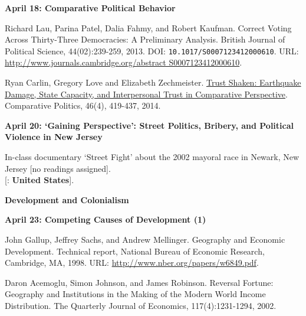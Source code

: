 \documentclass[letterpaper]{article}
\renewenvironment{itemize}{
  \begin{list}{}{
    \setlength{\leftmargin}{1.5em}
  }
}{
  \end{list}
}
\begin{document}
\begin{enumerate}
\begin{itemize}
\begin{itemize}
		\end{itemize}
	\end{itemize}


	\begin{itemize} 
		\item {\bf April 18: Comparative Political Behavior}
		\begin{itemize}
			\item[$\bullet$] Richard Lau, Parina Patel, Dalia Fahmy, and Robert Kaufman. Correct Voting Across Thirty-Three Democracies: A Preliminary Analysis. British Journal of Political Science, 44(02):239-259, 2013. DOI: \texttt{10.1017/S0007123412000610}. URL: \url{http://www.journals.cambridge.org/abstract S0007123412000610}.
			\item[$\bullet$] Ryan Carlin, Gregory Love and Elizabeth Zechmeister. \href{ http://www.jstor.org/stable/43664117}{Trust Shaken: Earthquake Damage, State Capacity, and Interpersonal Trust in Comparative Perspective}. Comparative Politics, 46(4), 419-437, 2014.
		\end{itemize}
	\end{itemize}


	\begin{itemize} 
		\item {\bf April 20: `Gaining Perspective': Street Politics, Bribery, and Political Violence in New Jersey}
		\begin{itemize}
			\item[$\bullet$] In-class documentary `Street Fight' about the 2002 mayoral race in Newark, New Jersey [no readings assigned].\\
			{\color{brown}[\faGlobe: {\bf United States}].}
		\end{itemize}
	\end{itemize}




\item {\bf Development and Colonialism}
	\begin{itemize}
		\item {\bf April 23: Competing Causes of Development (1)}
		\begin{itemize}
			\item[$\bullet$] John Gallup, Jeffrey Sachs, and Andrew Mellinger. Geography and Economic Development. Technical report, National Bureau of Economic Research, Cambridge, MA, 1998. URL: \url{http://www.nber.org/papers/w6849.pdf}.

			\item[$\bullet$] Daron Acemoglu, Simon Johnson, and James Robinson. Reversal Fortune: Geography and Institutions in the Making of the Modern World Income Distribution. The Quarterly Journal of Economics, 117(4):1231-1294, 2002.
		\end{itemize}


\end{itemize}
\end{enumerate}
\end{document}
